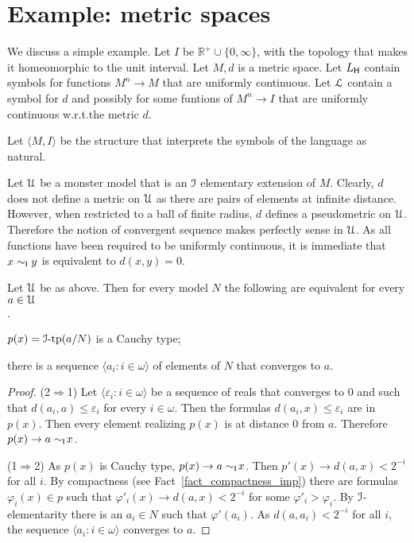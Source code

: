 \documentclass[10pt,oneside]{amsproc}
\newcommand{\mylabel}[1]{{#1}\hfill}
\renewenvironment{itemize}
  {\begin{list}{$\cdot$}{%
  \setlength{\parskip}{0mm}
  \setlength{\topsep}{.4\baselineskip}
  \setlength{\rightmargin}{0mm}
  \setlength{\listparindent}{0mm}
  \setlength{\itemindent}{0mm}
  \setlength{\labelwidth}{3ex}
  \setlength{\itemsep}{.2\baselineskip}
  \setlength{\parsep}{.2\baselineskip}
  \setlength{\partopsep}{0mm}
  \setlength{\labelsep}{1ex}
  \setlength{\leftmargin}{\labelwidth+\labelsep}
  \let\makelabel\mylabel}}{%
\end{list}}
\begin{document}
\section{Example: metric spaces}

We discuss a simple example.
Let $I$ be $\mathds{R}^+\cup\{0,\infty\}$, with the topology that makes it homeomorphic to the unit interval.
Let $M,d$ is a metric space.
Let $L_{\sf H}$ contain symbols for functions $M^n\to M$ that are uniformly continuous.
Let ${\EuScript L}$ contain a symbol for $d$ and possibly for some funtions of $M^n\to I$ that are uniformly continuous w.r.t.\@ the metric $d$.

Let $\langle M,I\rangle$ be the structure that interprets the symbols of the language as natural.

Let ${\EuScript U}$ be a monster model that is  an ${\EuScript I}$ elementary extension of $M$.
Clearly, $d$ does not define a metric on ${\EuScript U}$ as there are pairs of elements at infinite distance.
However, when restricted to a ball of finite radius, $d$ defines a pseudometric on  ${\EuScript U}$.
Therefore the notion of convergent sequence makes perfectly sense in ${\EuScript U}$.
As all functions have been required to be uniformly continuous, it is immediate that $x\sim_{\sf I}y$ is equivalent to $d(x,y)=0$.

\begin{fact}
  Let $ {\EuScript U}$ be as above.
  Then for every model $N$ the following are equivalent for every $a\in{\EuScript U}$
  \begin{itemize}
    \item[1.] $p(x)={\EuScript I}\mbox{-tp}(a/N)$ is a Cauchy type;
    \item[2.] there is a sequence $\langle a_i: i\in\omega\rangle$ of elements of $N$ that converges to $a$.
  \end{itemize} 
\end{fact}

\begin{proof}

  (2$\Rightarrow$1) 
  Let $\langle \varepsilon_i: i\in\omega\rangle$ be a sequence of reals that converges to $0$ and such that $d(a_i,a)\le\varepsilon_i$ for every $i\in\omega$.
  Then the formulas $d(a_i,x)\le\varepsilon_i$ are in $p(x)$.
  Then every element realizing $p(x)$ is at distance $0$ from $a$.
  Therefore  $p(x)\rightarrow a\sim_{\sf I}\!x$.


  (1$\Rightarrow$2) 
  As $p(x)$ is Cauchy type, $p(x)\rightarrow a\sim_{\sf I}\!x$.
  Then $p'(x)\rightarrow d(a,x)<2^{-i}$ for all $i$.
  By compactness (see Fact~\ref{fact_compactness_imp}) there are formulas $\varphi_i(x)\in p$ such that $\varphi'_i(x)\rightarrow d(a,x)<2^{-i}$ for some $\varphi'_i>\varphi_i$.
  By ${\EuScript I}$-elementarity there is an $a_i\in N$ such that $\varphi'(a_i)$.
  As $d(a,a_i)<2^{-i}$ for all $i$, the sequence $\langle a_i: i\in\omega\rangle$ converges to $a$.
\end{proof}
\end{document}
